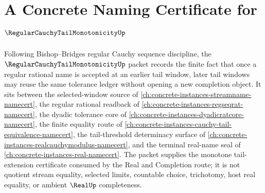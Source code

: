 \chapter{A Concrete Naming Certificate for $\RegularCauchyTailMonotonicityUp$}
\label{ch:concrete-instances-regular-cauchy-tail-monotonicity-namecert}

Following Bishop--Bridges regular Cauchy sequence discipline, the $\RegularCauchyTailMonotonicityUp$ packet records the finite fact that once a regular rational name is accepted at an earlier tail window, later tail windows may reuse the same tolerance ledger without opening a new completion object. It sits between the selected-window source of \autoref{ch:concrete-instances-streamname-namecert}, the regular rational readback of \autoref{ch:concrete-instances-regseqrat-namecert}, the dyadic tolerance core of \autoref{ch:concrete-instances-dyadicratcore-namecert}, the finite equality route of \autoref{ch:concrete-instances-cauchy-tail-equivalence-namecert}, the tail-threshold determinacy surface of \autoref{ch:concrete-instances-realcauchymodulus-namecert}, and the terminal real-name seal of \autoref{ch:concrete-instances-real-namecert}. The packet supplies the monotone tail-extension certificate consumed by the Real and Completion route; it is not quotient stream equality, selected limits, countable choice, trichotomy, host real equality, or ambient $\RealUp$ completeness.

